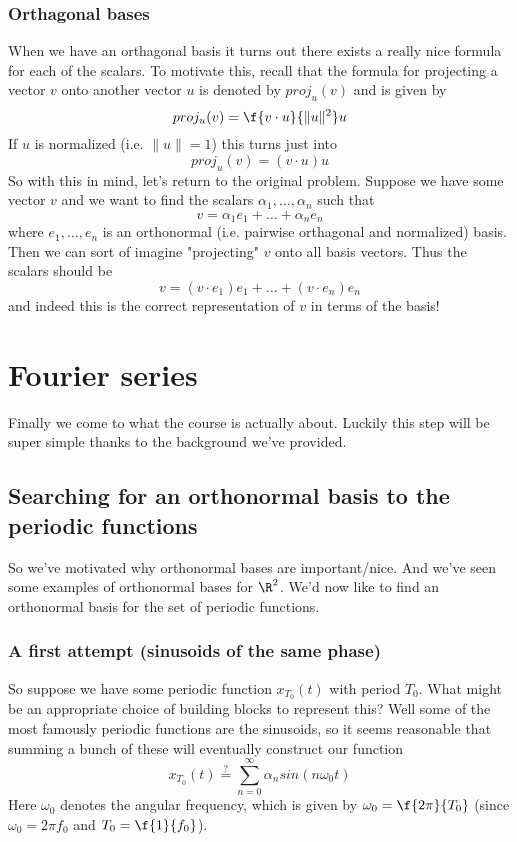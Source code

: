 \documentclass{article}
\newcommand{\0}{{\mathbf{0}}}
\newcommand{\texteq}[1]{\ensuremath{\stackrel{\text{#1}}{=}}}
\begin{document}
\subsubsection{Orthagonal bases}
When we have an orthagonal basis it turns out
there exists a really nice formula for each of the scalars. To motivate this,
recall that the formula for projecting a vector $v$ onto another vector $u$
is denoted by $proj_u(v)$ and is given by
$$ proj_u(v) = \f {v \cdot u}{\| u \|^2} u $$
If $u$ is normalized (i.e. $\| u \| = 1$) this turns just into
$$ proj_u(v) = (v \cdot u) u $$
So with this in mind, let's return to the original problem. Suppose we have some vector $v$ and
we want to find the scalars $\alpha_1,\dots,\alpha_n$ such that
$$ v = \alpha_1 e_1 + \dots + \alpha_n e_n$$
where $e_1,\dots,e_n$ is an orthonormal (i.e. pairwise orthagonal and normalized) basis.
Then we can sort of imagine "projecting" $v$ onto all basis vectors. Thus the scalars should be
$$ v = (v \cdot e_1) e_1 + \dots + (v \cdot e_n) e_n $$
and indeed this is the correct representation of $v$ in terms of the basis!

\clearpage
\section{Fourier series}
Finally we come to what the course is actually about. Luckily
this step will be super simple thanks to the background we've provided.

\subsection{Searching for an orthonormal basis to the periodic functions}
So we've motivated why orthonormal bases are important/nice. And we've
seen some examples of orthonormal bases for $\R^2$. We'd now like
to find an orthonormal basis for the set of periodic functions.

\subsubsection{A first attempt (sinusoids of the same phase)}
So suppose we have some periodic function $x_{T_0}(t)$ with period $T_0$. What
might be an appropriate choice of building blocks to represent this? Well some of the most famously periodic functions
are the sinusoids, so it seems reasonable that summing a bunch of these will eventually construct our function
$$ x_{T_0}(t) \texteq{?} \sum^{\infty}_{n = 0} \alpha_n sin(n \omega_0 t) $$
Here $\omega_0$ denotes the angular frequency, which is given by $\omega_0 = \f{2\pi}{T_0}$ (since $\omega_0 = 2\pi f_0$ and $T_0 = \f {1}{f_0}$).
\end{document}
